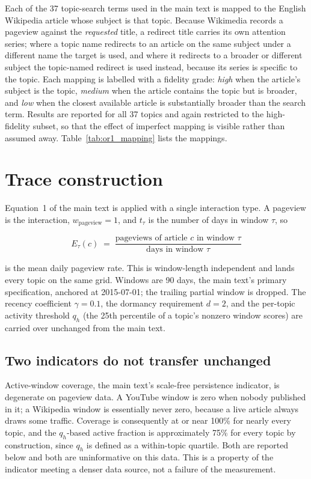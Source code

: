 \documentclass[11pt]{article}
\begin{document}
Each of the 37 topic-search terms used in the main text is mapped to the English
Wikipedia article whose subject is that topic. Because Wikimedia records a
pageview against the \emph{requested} title, a redirect title carries its own
attention series; where a topic name redirects to an article on the same subject
under a different name the target is used, and where it redirects to a broader or
different subject the topic-named redirect is used instead, because its series is
specific to the topic. Each mapping is labelled with a fidelity grade:
\emph{high} when the article's subject is the topic, \emph{medium} when the
article contains the topic but is broader, and \emph{low} when the closest
available article is substantially broader than the search term. Results are
reported for all 37 topics and again restricted to the high-fidelity subset, so
that the effect of imperfect mapping is visible rather than assumed away.
Table~\ref{tab:or1_mapping} lists the mappings.

\section{Trace construction}
\label{sec:or1_traces}

Equation~1 of the main text is applied with a single interaction type. A pageview
is the interaction, $w_{\mathrm{pageview}} = 1$, and $t_{\tau}$ is the number of
days in window $\tau$, so

\begin{equation}
E_{\tau}(c) \;=\; \frac{\text{pageviews of article } c \text{ in window } \tau}
                       {\text{days in window } \tau}
\label{eq:or1_window}
\end{equation}

is the mean daily pageview rate. This is window-length independent and lands
every topic on the same grid. Windows are 90 days, the main text's primary
specification, anchored at 2015-07-01; the trailing partial window is dropped.
The recency coefficient $\gamma = 0.1$, the dormancy requirement $d = 2$, and the
per-topic activity threshold $q_h$ (the 25th percentile of a topic's nonzero
window scores) are carried over unchanged from the main text.

\subsection{Two indicators do not transfer unchanged}
\label{sec:or1_indicators}

Active-window coverage, the main text's scale-free persistence indicator, is
degenerate on pageview data. A YouTube window is zero when nobody published in
it; a Wikipedia window is essentially never zero, because a live article always
draws some traffic. Coverage is consequently at or near 100\% for nearly every
topic, and the $q_h$-based active fraction is approximately 75\% for every topic
by construction, since $q_h$ is defined as a within-topic quartile. Both are
reported below and both are uninformative on this data. This is a property of the
indicator meeting a denser data source, not a failure of the measurement.
\end{document}
